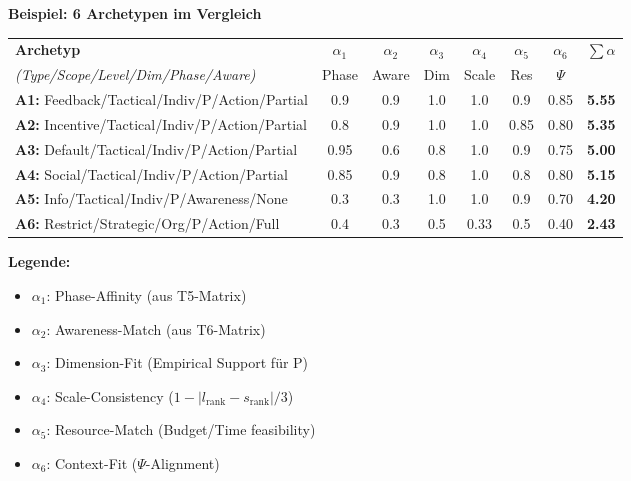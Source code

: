 \begin{tcolorbox}[colback=yellow!5!white, colframe=yellow!75!black,
    title=\textbf{Schritt 2: Alignment-Komponenten $\alpha_i$ für jeden Archetyp berechnen}]

\textbf{Beispiel: 6 Archetypen im Vergleich}

\medskip
\renewcommand{\arraystretch}{1.2}
\begin{tabular}{@{}lcccccc|c@{}}
\toprule
\textbf{Archetyp} & $\alpha_1$ & $\alpha_2$ & $\alpha_3$ & $\alpha_4$ & $\alpha_5$ & $\alpha_6$ & $\sum\alpha$ \\
\textit{(Type/Scope/Level/Dim/Phase/Aware)} & \scriptsize Phase & \scriptsize Aware & \scriptsize Dim & \scriptsize Scale & \scriptsize Res & \scriptsize $\Psi$ & \\
\midrule
\textbf{A1:} Feedback/Tactical/Indiv/P/Action/Partial & 0.9 & 0.9 & 1.0 & 1.0 & 0.9 & 0.85 & \textbf{5.55} \\
\textbf{A2:} Incentive/Tactical/Indiv/P/Action/Partial & 0.8 & 0.9 & 1.0 & 1.0 & 0.85 & 0.80 & \textbf{5.35} \\
\textbf{A3:} Default/Tactical/Indiv/P/Action/Partial & 0.95 & 0.6 & 0.8 & 1.0 & 0.9 & 0.75 & \textbf{5.00} \\
\textbf{A4:} Social/Tactical/Indiv/P/Action/Partial & 0.85 & 0.9 & 0.8 & 1.0 & 0.8 & 0.80 & \textbf{5.15} \\
\textbf{A5:} Info/Tactical/Indiv/P/Awareness/None & 0.3 & 0.3 & 1.0 & 1.0 & 0.9 & 0.70 & \textbf{4.20} \\
\textbf{A6:} Restrict/Strategic/Org/P/Action/Full & 0.4 & 0.3 & 0.5 & 0.33 & 0.5 & 0.40 & \textbf{2.43} \\
\bottomrule
\end{tabular}

\medskip
\textbf{Legende:}
\begin{itemize}[nosep]
    \item $\alpha_1$: Phase-Affinity (aus T5-Matrix)
    \item $\alpha_2$: Awareness-Match (aus T6-Matrix)
    \item $\alpha_3$: Dimension-Fit (Empirical Support für P)
    \item $\alpha_4$: Scale-Consistency ($1 - |l_{\text{rank}} - s_{\text{rank}}|/3$)
    \item $\alpha_5$: Resource-Match (Budget/Time feasibility)
    \item $\alpha_6$: Context-Fit ($\Psi$-Alignment)
\end{itemize}

\end{tcolorbox}

